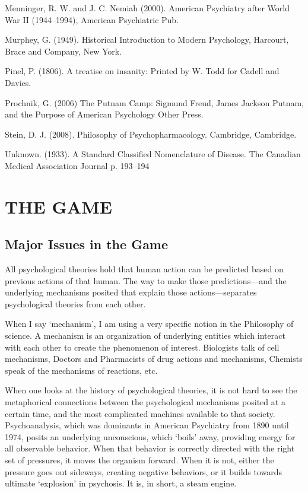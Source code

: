 Menninger, R. W. and J. C. Nemiah (2000). American Psychiatry after World War II (1944--1994), American Psychiatric Pub.

Murphey, G. (1949). Historical Introduction to Modern Psychology, Harcourt, Brace and Company, New York.

Pinel, P. (1806). A treatise on insanity: Printed by W. Todd for Cadell and Davies.

Prochnik, G. (2006) The Putnam Camp: Sigmund Freud, James Jackson Putnam, and the Purpose of American Psychology Other Press.

Stein, D. J. (2008). Philosophy of Psychopharmacology. Cambridge, Cambridge.

Unknown. (1933). A Standard Classified Nomenclature of Disease. The Canadian Medical Association Journal p. 193--194

\pagebreak 

\chapter{THE GAME}
\label{thegame}

\section{Major Issues in the Game}
\label{majorissuesinthegame}

All psychological theories hold that human action can be predicted based on previous actions of that human. The way to make those predictions---and the underlying mechanisms posited that explain those actions---separates psychological theories from each other.

When I say `mechanism', I am using a very specific notion in the Philosophy of science. A mechanism is an organization of underlying entities which interact with each other to create the phenomenon of interest. Biologists talk of cell mechanisms, Doctors and Pharmacists of drug actions and mechanisms, Chemists speak of the mechanisms of reactions, etc. 

When one looks at the history of psychological theories, it is not hard to see the metaphorical connections between the psychological mechanisms posited at a certain time, and the most complicated machines available to that society. Psychoanalysis, which was dominants in American Psychiatry from 1890 until 1974, posits an underlying unconscious, which `boils' away, providing energy for all observable behavior. When that behavior is correctly directed with the right set of pressures, it moves the organism forward. When it is not, either the pressure goes out sideways, creating negative behaviors, or it builds towards ultimate `explosion' in psychosis. It is, in short, a steam engine.


